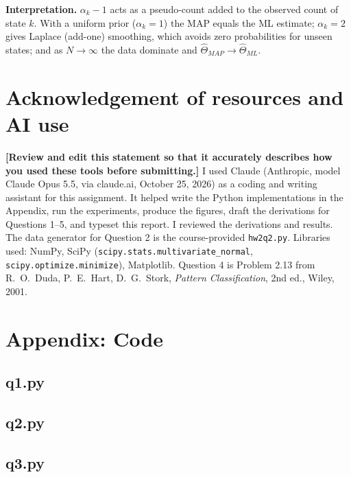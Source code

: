 \documentclass[11pt]{article}
\begin{document}
\textbf{Interpretation.} $\alpha_k-1$ acts as a pseudo-count added to the observed count of state $k$. With a uniform prior ($\alpha_k=1$) the MAP equals the ML estimate; $\alpha_k=2$ gives Laplace (add-one) smoothing, which avoids zero probabilities for unseen states; and as $N\to\infty$ the data dominate and $\hat\Theta_{MAP}\to\hat\Theta_{ML}$.

\section*{Acknowledgement of resources and AI use}
\textbf{[Review and edit this statement so that it accurately describes how you used these tools before submitting.]}
I used Claude (Anthropic, model Claude Opus 5.5, via claude.ai, October 25, 2026) as a coding and writing assistant for this assignment. It helped write the Python implementations in the Appendix, run the experiments, produce the figures, draft the derivations for Questions 1--5, and typeset this report. I reviewed the derivations and results. The data generator for Question 2 is the course-provided \texttt{hw2q2.py}. Libraries used: NumPy, SciPy (\texttt{scipy.stats.multivariate\_normal}, \texttt{scipy.optimize.minimize}), Matplotlib. Question 4 is Problem 2.13 from R.~O.~Duda, P.~E.~Hart, D.~G.~Stork, \emph{Pattern Classification}, 2nd ed., Wiley, 2001.

\newpage
\section*{Appendix: Code}
\subsection*{q1.py}
\subsection*{q2.py}
\subsection*{q3.py}
\end{document}
